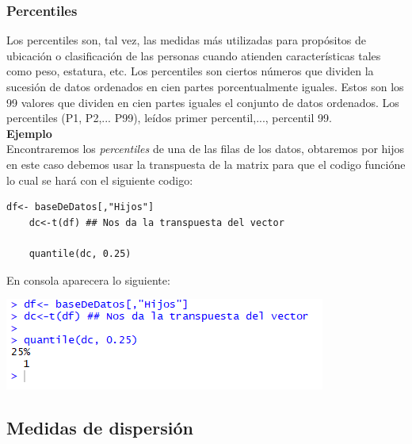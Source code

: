 \documentclass[12pt,hidelinks]{article}
\begin{document}
	\subsubsection{Percentiles}
	Los percentiles son, tal vez, las medidas más utilizadas para propósitos de ubicación o clasificación de las personas cuando atienden características tales como peso, estatura, etc. 
	Los percentiles son ciertos números que dividen la sucesión de datos ordenados en cien partes porcentualmente iguales. Estos son los 99 valores que dividen en cien partes iguales el conjunto de datos ordenados. Los percentiles (P1, P2,... P99), leídos primer percentil,..., percentil 99.\\
	\textbf{Ejemplo}\\
	\vspace{2mm}
	Encontraremos los \textit{percentiles} de una de las filas de los datos, obtaremos por hijos  en este caso debemos usar la transpuesta de la matrix para que el codigo funcióne lo cual se hará con el siguiente codigo:
	\begin{lstlisting}[frame=single]
	df<- baseDeDatos[,"Hijos"]
	dc<-t(df) ## Nos da la transpuesta del vector
	
	quantile(dc, 0.25)
	\end{lstlisting}
	En consola aparecera lo siguiente:
	\begin{center}
		\includegraphics[]{Percentiles.PNG}
	\end{center}
	
	\subsection{Medidas de dispersión}
\end{document}
